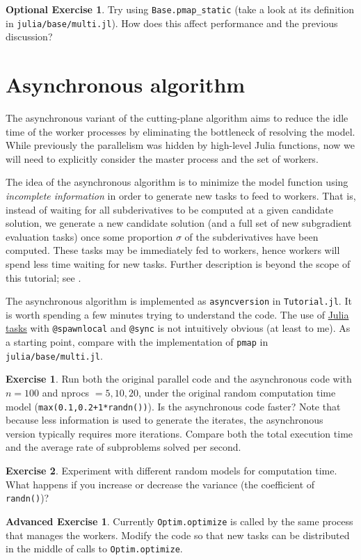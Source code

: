 \documentclass[12pt]{article}
\theoremstyle{definition}
\newtheorem*{advex}{Advanced Exercise}
\newtheorem*{optex}{Optional Exercise}
\newtheorem{ex}{Exercise}
\begin{document}
\begin{optex}
Try using \texttt{Base.pmap\_static} (take a look at its definition in \texttt{julia/base/multi.jl}). How does this affect performance and the previous discussion?
\end{optex}

\section{Asynchronous algorithm}
The asynchronous variant of the cutting-plane algorithm aims to reduce the idle time of the worker processes by eliminating the bottleneck of resolving the model. While previously the parallelism was hidden by high-level Julia functions, now we will need to explicitly consider the master process and the set of workers.

The idea of the asynchronous algorithm is to minimize the model function using \textit{incomplete information} in order to generate new tasks to feed to workers. That is, instead of waiting for all subderivatives to be computed at a given candidate solution, we generate a new candidate solution (and a full set of new subgradient evaluation tasks) once some proportion $\sigma$ of the subderivatives have been computed. These tasks may be immediately fed to workers, hence workers will spend less time waiting for new tasks. Further description is beyond the scope of this tutorial; see \cite{Linderoth03}.

The asynchronous algorithm is implemented as \texttt{asyncversion} in \texttt{Tutorial.jl}. It is worth spending a few minutes trying to understand the code. The use of \href{http://docs.julialang.org/en/latest/manual/control-flow/#man-tasks}{Julia tasks} with \texttt{@spawnlocal} and \texttt{@sync} is not intuitively obvious (at least to me). As a starting point, compare with the implementation of \texttt{pmap} in \texttt{julia/base/multi.jl}.

\begin{ex}
Run both the original parallel code and the asynchronous code with $n = 100$ and nprocs $= 5, 10, 20$, under the original random computation time model (\texttt{max(0.1,0.2+1*randn())}). Is the asynchronous code faster? Note that because less information is used to generate the iterates, the asynchronous version typically requires more iterations. Compare both the total execution time and the average rate of subproblems solved per second.
\end{ex}

\begin{ex}
Experiment with different random models for computation time. What happens if you increase or decrease the variance (the coefficient of \texttt{randn()})?
\end{ex}

\begin{advex}
Currently \texttt{Optim.optimize} is called by the same process that manages the workers. Modify the code so that new tasks can be distributed in the middle of calls to \texttt{Optim.optimize}.
\end{advex}


{}

\end{document}
